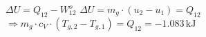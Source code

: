 \( \Delta U = Q_{12} - W_{12}^{o} \)  
\( \Delta U = m_{g} \cdot (u_{2} - u_{1}) = Q_{12} \)  
\( \Rightarrow m_{g} \cdot c_{V} \cdot (T_{g,2} - T_{g,1}) = Q_{12} = -1.083 \, \text{kJ} \)